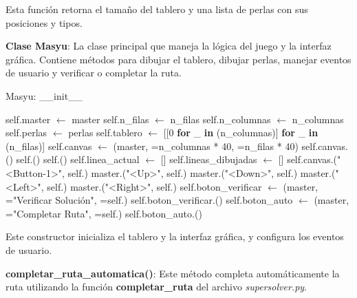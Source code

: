 \documentclass{article}
\begin{document}
Esta función retorna el tamaño del tablero y una lista de perlas con sus posiciones y tipos.

\textbf{Clase Masyu}: La clase principal que maneja la lógica del juego y la interfaz gráfica. Contiene métodos para dibujar el tablero, dibujar perlas, manejar eventos de usuario y verificar o completar la ruta.

\begin{algorithm}[H]
\caption{Masyu: \_\_init\_\_}
\begin{algorithmic}[1]
    \State self.master $\leftarrow$ master
    \State self.n\_filas $\leftarrow$ n\_filas
    \State self.n\_columnas $\leftarrow$ n\_columnas
    \State self.perlas $\leftarrow$ perlas
    \State self.tablero $\leftarrow$ [[0 \textbf{for} \_ \textbf{in} (n\_columnas)] \textbf{for} \_ \textbf{in} (n\_filas)]
    \State self.canvas $\leftarrow$ (master, =n\_columnas * 40, =n\_filas * 40)
    \State self.canvas.()
    \State self.()
    \State self.()
    \State self.linea\_actual $\leftarrow$ []
    \State self.lineas\_dibujadas $\leftarrow$ []
    \State self.canvas.("<Button-1>", self.)
    \State master.("<Up>", self.)
    \State master.("<Down>", self.)
    \State master.("<Left>", self.)
    \State master.("<Right>", self.)
    \State self.boton\_verificar $\leftarrow$ (master, ="Verificar Solución", =self.)
    \State self.boton\_verificar.()
    \State self.boton\_auto $\leftarrow$ (master, ="Completar Ruta", =self.)
    \State self.boton\_auto.()
\EndProcedure
\end{algorithmic}
\end{algorithm}

Este constructor inicializa el tablero y la interfaz gráfica, y configura los eventos de usuario.

\textbf{completar\_ruta\_automatica()}: Este método completa automáticamente la ruta utilizando la función \textbf{completar\_ruta} del archivo \textit{supersolver.py}.
\end{document}
